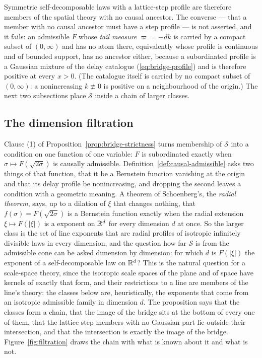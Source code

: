 Symmetric self-decomposable laws with a lattice-step profile are therefore members of the
spatial theory with no causal ancestor. The converse --- that a member with no causal ancestor
must have a step profile --- is not asserted, and it fails: an admissible $F$
whose \emph{tail measure} $\varpi = -dk$ is carried by a compact subset of $(0,\infty)$ and has no
atom there, equivalently whose profile is continuous and of bounded support,
has no ancestor either, because a subordinated profile is a Gaussian mixture of the delay
catalogue (\ref{eq:bridge-profile}) and is therefore positive at every $x > 0$. (The catalogue
itself is carried by no compact subset of $(0,\infty)$: a nonincreasing $k \not\equiv 0$ is
positive on a neighbourhood of the origin.) The next two
subsections place $\mathcal{S}$ inside a chain of larger classes.

\subsection{The dimension filtration}\label{sec:filtration}

Clause (1) of Proposition~\ref{prop:bridge-strictness} turns membership of $\mathcal{S}$ into a
condition on one function of one variable: $F$ is subordinated exactly when
$\sigma \mapsto F(\sqrt{2\sigma})$ is causally admissible. Definition~\ref{def:causal-admissible}
asks two things of that function, that it be a Bernstein function vanishing at the origin and
that its delay profile be nonincreasing, and dropping the second leaves a condition with a
geometric meaning. A theorem of Schoenberg's, the \emph{radial theorem}, says, up to a dilation
of $\xi$ that changes nothing, that
$f(\sigma) = F(\sqrt{2\sigma})$ is a Bernstein function exactly when the radial extension
$\xi \mapsto F(|\xi|)$ is a \Levy{} exponent on $\mathbb{R}^d$ for every dimension $d$ at once. So the
larger class is the set of line exponents that are radial profiles of isotropic infinitely
divisible laws in every dimension, and the question how far $\mathcal{S}$ is from the
admissible cone can be asked dimension by dimension: for which $d$ is $F(|\xi|)$ the exponent
of a self-decomposable law on $\mathbb{R}^d$? This is the natural question for a scale-space theory,
since the isotropic scale spaces of the plane and of space have kernels of exactly that form,
and their restrictions to a line are members of the line's theory: the classes below are,
heuristically, the exponents that come from an isotropic admissible family in dimension $d$.
The proposition says that the classes form a chain, that the image of the bridge sits at the
bottom of every one of them, that the lattice-step members with no Gaussian part lie
outside their intersection, and that the intersection is exactly the image of the bridge. Figure~\ref{fig:filtration} draws the chain with what is known
about it and what is not.

